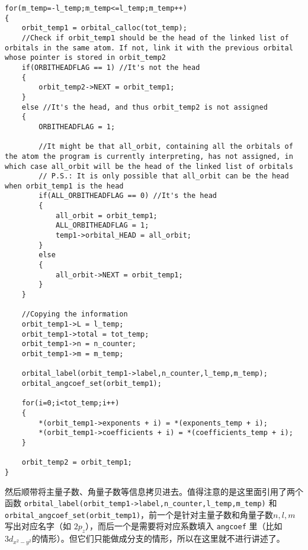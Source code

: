 \documentclass[12pt,a4paper,openany,twoside]{article}
\numberwithin{equation}{section}
\begin{document}
            \begin{lstlisting}
for(m_temp=-l_temp;m_temp<=l_temp;m_temp++)
{
    orbit_temp1 = orbital_calloc(tot_temp);
    //Check if orbit_temp1 should be the head of the linked list of orbitals in the same atom. If not, link it with the previous orbital whose pointer is stored in orbit_temp2
    if(ORBITHEADFLAG == 1) //It's not the head
    {
        orbit_temp2->NEXT = orbit_temp1;
    }
    else //It's the head, and thus orbit_temp2 is not assigned
    {
        ORBITHEADFLAG = 1;

        //It might be that all_orbit, containing all the orbitals of the atom the program is currently interpreting, has not assigned, in which case all_orbit will be the head of the linked list of orbitals
        // P.S.: It is only possible that all_orbit can be the head when orbit_temp1 is the head
        if(ALL_ORBITHEADFLAG == 0) //It's the head
        {
            all_orbit = orbit_temp1;
            ALL_ORBITHEADFLAG = 1;
            temp1->orbital_HEAD = all_orbit;
        }
        else
        {
            all_orbit->NEXT = orbit_temp1;
        }
    }

    //Copying the information
    orbit_temp1->L = l_temp;
    orbit_temp1->total = tot_temp;
    orbit_temp1->n = n_counter;
    orbit_temp1->m = m_temp;

    orbital_label(orbit_temp1->label,n_counter,l_temp,m_temp);
    orbital_angcoef_set(orbit_temp1);

    for(i=0;i<tot_temp;i++)
    {
        *(orbit_temp1->exponents + i) = *(exponents_temp + i);
        *(orbit_temp1->coefficients + i) = *(coefficients_temp + i);
    }

    orbit_temp2 = orbit_temp1;
}
            \end{lstlisting}

            然后顺带将主量子数、角量子数等信息拷贝进去。值得注意的是这里面引用了两个函数 \lstinline$orbital_label(orbit_temp1->label,n_counter,l_temp,m_temp)$ 和 \lstinline$orbital_angcoef_set(orbit_temp1)$，前一个是针对主量子数和角量子数$n,l,m$写出对应名字（如 $2p_z$），而后一个是需要将对应系数填入 \lstinline$angcoef$ 里（比如$3d_{x^2-y^2}$的情形）。但它们只能做成分支的情形，所以在这里就不进行讲述了。
\end{document}
